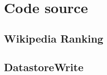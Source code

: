 \appendix

\chapter{Code source}

\section{Wikipedia Ranking}


\clearpage

\section{DatastoreWrite}


\clearpage